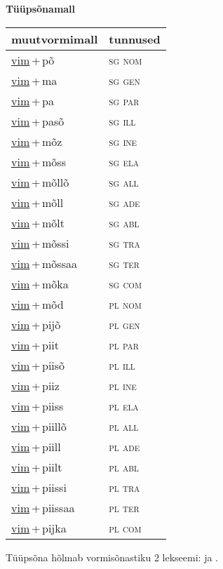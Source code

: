
\vspace{1.8em}
\begin{minipage}{\textwidth}
\textbf{Tüüpsõnamall \,}\\

\begin{sideways}
\begin{tabular}{l l}
muutvormimall & tunnused \\
\hline
\underline{vim}\,+\,põ & \textsc{ sg nom } \\
\underline{vim}\,+\,ma & \textsc{ sg gen } \\
\underline{vim}\,+\,pa & \textsc{ sg par } \\
\underline{vim}\,+\,pasõ & \textsc{ sg ill } \\
\underline{vim}\,+\,mõz & \textsc{ sg ine } \\
\underline{vim}\,+\,mõss & \textsc{ sg ela } \\
\underline{vim}\,+\,mõllõ & \textsc{ sg all } \\
\underline{vim}\,+\,mõll & \textsc{ sg ade } \\
\underline{vim}\,+\,mõlt & \textsc{ sg abl } \\
\underline{vim}\,+\,mõssi & \textsc{ sg tra } \\
\underline{vim}\,+\,mõssaa & \textsc{ sg ter } \\
\underline{vim}\,+\,mõka & \textsc{ sg com } \\
\underline{vim}\,+\,mõd & \textsc{ pl nom } \\
\underline{vim}\,+\,pijõ & \textsc{ pl gen } \\
\underline{vim}\,+\,piit & \textsc{ pl par } \\
\underline{vim}\,+\,piisõ & \textsc{ pl ill } \\
\underline{vim}\,+\,piiz & \textsc{ pl ine } \\
\underline{vim}\,+\,piiss & \textsc{ pl ela } \\
\underline{vim}\,+\,piillõ & \textsc{ pl all } \\
\underline{vim}\,+\,piill & \textsc{ pl ade } \\
\underline{vim}\,+\,piilt & \textsc{ pl abl } \\
\underline{vim}\,+\,piissi & \textsc{ pl tra } \\
\underline{vim}\,+\,piissaa & \textsc{ pl ter } \\
\underline{vim}\,+\,pijka & \textsc{ pl com } \\
\end{tabular}
\end{sideways}
\label{tab:tüüpsõnamall-vimpõ}

\end{minipage}

 
\vspace{1em}
\noindent Tüüpsõna hõlmab vormisõnastiku 2 lekseemi:  ja .
